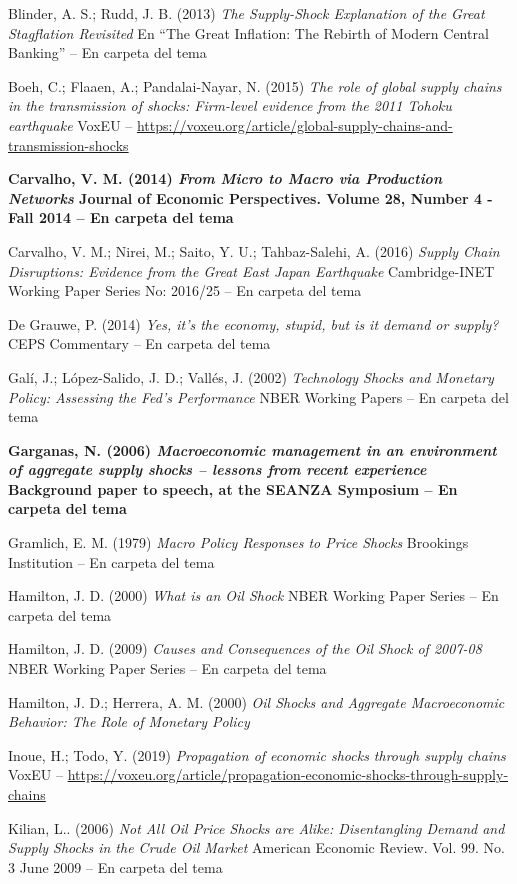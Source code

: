 \documentclass{nuevotema}
\begin{document}
Blinder, A. S.; Rudd, J. B. (2013) \textit{The Supply-Shock Explanation of the Great Stagflation Revisited} En ``The Great Inflation: The Rebirth of Modern Central Banking'' -- En carpeta del tema

Boeh, C.; Flaaen, A.; Pandalai-Nayar, N. (2015) \textit{The role of global supply chains in the transmission of shocks: Firm-level evidence from the 2011 Tohoku earthquake} VoxEU -- \url{https://voxeu.org/article/global-supply-chains-and-transmission-shocks}

\textbf{Carvalho, V. M. (2014) \textit{From Micro to Macro via Production Networks} Journal of Economic Perspectives. Volume 28, Number 4 - Fall 2014 -- En carpeta del tema}

Carvalho, V. M.; Nirei, M.; Saito, Y. U.; Tahbaz-Salehi, A. (2016) \textit{Supply Chain Disruptions: Evidence from the Great East Japan Earthquake} Cambridge-INET Working Paper Series No: 2016/25 -- En carpeta del tema

De Grauwe, P. (2014) \textit{Yes, it's the economy, stupid, but is it demand or supply?} CEPS Commentary -- En carpeta del tema

Galí, J.; López-Salido, J. D.; Vallés, J. (2002) \textit{Technology Shocks and Monetary Policy: Assessing the Fed's Performance} NBER Working Papers -- En carpeta del tema

\textbf{Garganas, N. (2006) \textit{Macroeconomic management in an environment of aggregate supply shocks -- lessons from recent experience} Background paper to speech, at the SEANZA Symposium -- En carpeta del tema}

Gramlich, E. M. (1979) \textit{Macro Policy Responses to Price Shocks} Brookings Institution -- En carpeta del tema

Hamilton, J. D. (2000) \textit{What is an Oil Shock} NBER Working Paper Series -- En carpeta del tema

Hamilton, J. D. (2009) \textit{Causes and Consequences of the Oil Shock of 2007-08} NBER Working Paper Series -- En carpeta del tema

Hamilton, J. D.; Herrera, A. M. (2000) \textit{Oil Shocks and Aggregate Macroeconomic Behavior: The Role of Monetary Policy} 

Inoue, H.; Todo, Y. (2019) \textit{Propagation of economic shocks through supply chains} VoxEU -- \url{https://voxeu.org/article/propagation-economic-shocks-through-supply-chains}

Kilian, L.. (2006) \textit{Not All Oil Price Shocks are Alike: Disentangling Demand and Supply Shocks in the Crude Oil Market} American Economic Review. Vol. 99. No. 3 June 2009 -- En carpeta del tema
\end{document}
